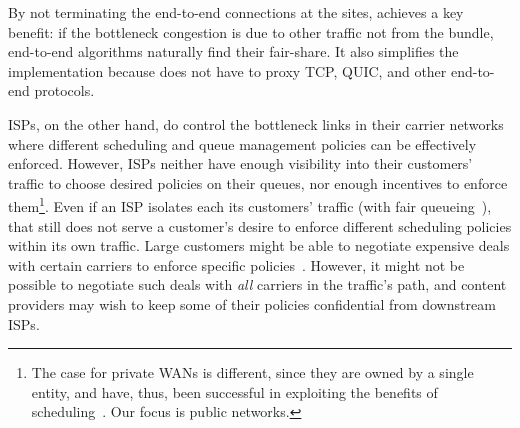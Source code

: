 By not terminating the end-to-end connections at the sites, \name{} achieves a key benefit: if the bottleneck congestion is due to other traffic not from the bundle, end-to-end algorithms naturally find their fair-share. It also simplifies the implementation because \name{} does not have to proxy TCP, QUIC, and other end-to-end protocols.






ISPs, on the other hand, do control the bottleneck links in their carrier networks where different scheduling and queue management policies can be effectively enforced. 
However, ISPs neither have enough visibility into their customers' traffic to choose desired policies on their queues, nor enough incentives to enforce them\footnote{The case for private WANs is different, since they are owned by a single entity, and have, thus, been successful in exploiting the benefits of scheduling~\cite{swan, b4, bwe}. Our focus is public networks.}. Even if an ISP isolates each its customers' traffic (\eg with fair queueing~\cite{fair-queueing}), that still does not serve a customer's desire to enforce different scheduling policies within its own traffic.  
Large customers might be able to negotiate expensive deals with certain carriers to enforce specific policies~\cite{att-qos}. 
However, it might not be possible to negotiate such deals with \emph{all} carriers in the traffic's path, and content providers may wish to keep some of their policies confidential from downstream ISPs. 

\fi




